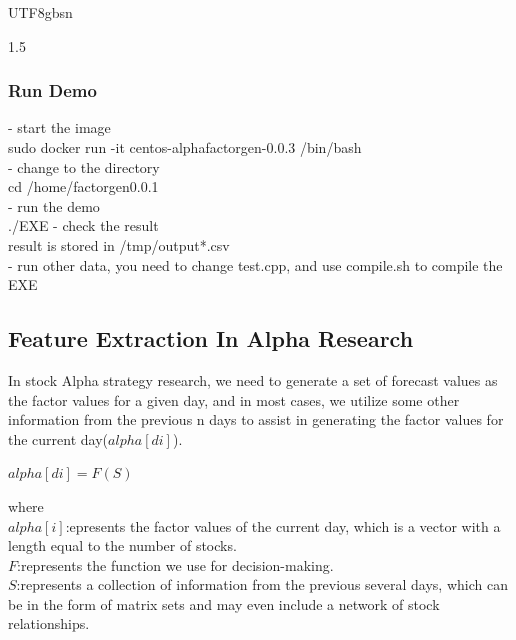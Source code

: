 \documentclass{article}
\begin{document}
\begin{CJK}{UTF8}{gbsn}
\begin{spacing}{1.5}
\subsubsection{Run Demo}
- start the image \\
sudo docker run -it centos-alphafactorgen-0.0.3 /bin/bash\\
- change to the directory\\
cd /home/factorgen0.0.1\\
- run the demo\\
./EXE
- check the result\\
result is stored in /tmp/output*.csv\\
- run other data, you need to change test.cpp, and use compile.sh to compile the EXE\\







\subsection{Feature Extraction In Alpha Research}


In stock Alpha strategy research, we need to generate a set of forecast values as the factor values for a given day, and in most cases, we utilize some other information from the previous n days to assist in generating the factor values for the current day($alpha[di]$).\\
  \centerline{$alpha[di] = F(S)$}
where  \\
$alpha[i]$:epresents the factor values of the current day, which is a vector with a length equal to the number of stocks.\\
$F$:represents the function we use for decision-making.  \\
$S$:represents a collection of information from the previous several days, which can be in the form of matrix sets and may even include a network of stock relationships.\\


\end{spacing}
\end{CJK}
\end{document}
